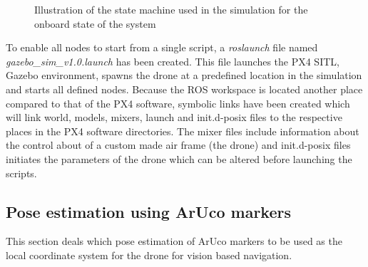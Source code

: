 \documentclass[../Head/report.tex]{subfiles}
\begin{document}
 \begin{figure}[H]
    \centering
    \scalebox{.9}{}
    \caption{Illustration of the state machine used in the simulation for the onboard state of the system}
    \label{fig:state_machine_simulation}
\end{figure}

To enable all nodes to start from a single script, a \textit{roslaunch} file named \textit{gazebo\_sim\_v1.0.launch} has been created. This file launches the PX4 SITL, Gazebo environment, spawns the drone at a predefined location in the simulation and starts all defined nodes. Because the ROS workspace is located another place compared to that of the PX4 software, symbolic links have been created which will link world, models, mixers, launch and init.d-posix files to the respective places in the PX4 software directories. The mixer files include information about the control about of a custom made air frame (the drone) and init.d-posix files initiates the parameters of the drone which can be altered before launching the scripts.   



\subsection{Pose estimation using ArUco markers}
\label{sec:pose_estimation_using_aruco_markers}


This section deals which pose estimation of ArUco markers to be used as the local coordinate system for the drone for vision based navigation. 
\end{document}

